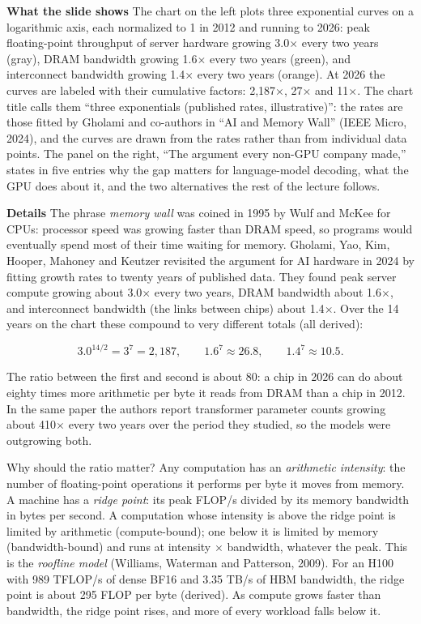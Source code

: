 \documentclass[11pt,letterpaper]{article}
\newcommand{\para}[1]{\medskip\noindent\textbf{#1}\quad}
\newenvironment{formulas}{\begin{tcolorbox}[formulabox]}{\end{tcolorbox}}
\begin{document}
\para{What the slide shows} The chart on the left plots three exponential curves on a logarithmic axis, each normalized to 1 in 2012 and running to 2026: peak floating-point throughput of server hardware growing 3.0$\times$ every two years (gray), DRAM bandwidth growing 1.6$\times$ every two years (green), and interconnect bandwidth growing 1.4$\times$ every two years (orange). At 2026 the curves are labeled with their cumulative factors: 2{,}187$\times$, 27$\times$ and 11$\times$. The chart title calls them ``three exponentials (published rates, illustrative)'': the rates are those fitted by Gholami and co-authors in ``AI and Memory Wall'' (IEEE Micro, 2024), and the curves are drawn from the rates rather than from individual data points. The panel on the right, ``The argument every non-GPU company made,'' states in five entries why the gap matters for language-model decoding, what the GPU does about it, and the two alternatives the rest of the lecture follows.

\para{Details} The phrase \emph{memory wall} was coined in 1995 by Wulf and McKee for CPUs: processor speed was growing faster than DRAM speed, so programs would eventually spend most of their time waiting for memory. Gholami, Yao, Kim, Hooper, Mahoney and Keutzer revisited the argument for AI hardware in 2024 by fitting growth rates to twenty years of published data. They found peak server compute growing about 3.0$\times$ every two years, DRAM bandwidth about 1.6$\times$, and interconnect bandwidth (the links between chips) about 1.4$\times$. Over the 14 years on the chart these compound to very different totals (all derived):
\begin{formulas}
\[ 3.0^{14/2} = 3^7 = 2{,}187, \qquad 1.6^{7} \approx 26.8, \qquad 1.4^{7} \approx 10.5. \]
\end{formulas}
The ratio between the first and second is about 80: a chip in 2026 can do about eighty times more arithmetic per byte it reads from DRAM than a chip in 2012. In the same paper the authors report transformer parameter counts growing about 410$\times$ every two years over the period they studied, so the models were outgrowing both.

Why should the ratio matter? Any computation has an \emph{arithmetic intensity}: the number of floating-point operations it performs per byte it moves from memory. A machine has a \emph{ridge point}: its peak FLOP/s divided by its memory bandwidth in bytes per second. A computation whose intensity is above the ridge point is limited by arithmetic (compute-bound); one below it is limited by memory (bandwidth-bound) and runs at intensity $\times$ bandwidth, whatever the peak. This is the \emph{roofline model} (Williams, Waterman and Patterson, 2009). For an H100 with 989 TFLOP/s of dense BF16 and 3.35 TB/s of HBM bandwidth, the ridge point is about 295 FLOP per byte (derived). As compute grows faster than bandwidth, the ridge point rises, and more of every workload falls below it.
\end{document}
